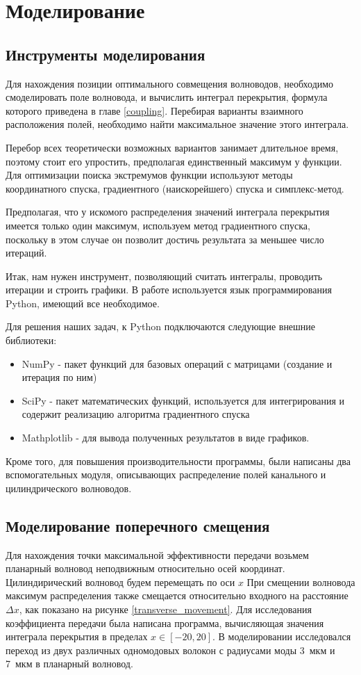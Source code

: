 \chapter{Моделирование}
\section{Инструменты моделирования}
Для нахождения позиции оптимального совмещения волноводов, необходимо смоделировать поле волновода, и вычислить интеграл перекрытия, формула которого приведена в главе \ref{coupling}. Перебирая варианты взаимного расположения полей, необходимо найти максимальное значение этого интеграла.

Перебор всех теоретически возможных вариантов занимает длительное время, поэтому стоит его упростить, предполагая единственный максимум у функции. Для оптимизации поиска экстремумов функции используют методы координатного спуска, градиентного (наискорейшего) спуска и симплекс-метод.\cite{numeric} 

Предполагая, что у искомого распределения значений интеграла перекрытия имеется только один максимум, используем метод градиентного спуска, поскольку в этом случае он позволит достичь результата за меньшее число итераций. \cite{mathews}

Итак, нам нужен инструмент, позволяющий считать интегралы, проводить итерации и строить графики. В работе используется язык программирования Python, имеющий все необходимое. 

Для решения наших задач, к Python подключаются следующие внешние библиотеки:
\begin{itemize}
	\item NumPy - пакет функций для базовых операций с матрицами (создание и итерация по ним)
	\item SciPy - пакет математических функций, используется для интегрирования и содержит реализацию алгоритма градиентного спуска
	\item Mathplotlib - для вывода полученных результатов в виде графиков.
\end{itemize}

Кроме того, для повышения производительности программы, были написаны два вспомогательных модуля, описывающих распределение полей канального и цилиндрического волноводов.

\section{Моделирование поперечного смещения}
\label{transverse_section}
Для нахождения точки максимальной эффективности передачи возьмем планарный волновод неподвижным относительно осей координат. Цилиндирический волновод будем перемещать по оси $x$ При смещении волновода максимум распределения также смещается относительно входного на расстояние $\Delta x$, как показано на рисунке \ref{transverse_movement}. Для исследования коэффициента передачи была написана программа, вычисляющая значения интеграла перекрытия в пределах $x \in [-20, 20]$.
В моделировании исследовался переход из двух различных одномодовых волокон с радиусами моды 3~мкм и 7~мкм в планарный волновод. 

